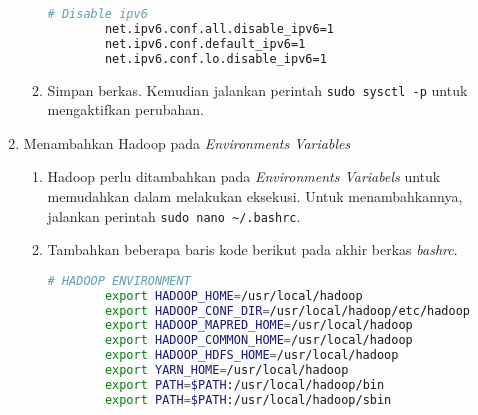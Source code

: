 \begin{enumerate}
\begin{enumerate}
      \begin{lstlisting}[language=bash]
    	# Disable ipv6
		net.ipv6.conf.all.disable_ipv6=1
		net.ipv6.conf.default_ipv6=1
		net.ipv6.conf.lo.disable_ipv6=1
      \end{lstlisting}
    \item Simpan berkas. Kemudian jalankan perintah \verb|sudo sysctl -p| untuk mengaktifkan perubahan.
  \end{enumerate}
  \item Menambahkan Hadoop pada \textit{Environments Variables}
  \begin{enumerate}
    \item Hadoop perlu ditambahkan pada \textit{Environments Variabels} untuk memudahkan dalam melakukan eksekusi. Untuk menambahkannya, jalankan perintah \verb|sudo nano ~/.bashrc|.
    \item Tambahkan beberapa baris kode berikut pada akhir berkas \textit{bashrc}.
      \begin{lstlisting}[language=bash]
		# HADOOP ENVIRONMENT
		export HADOOP_HOME=/usr/local/hadoop
		export HADOOP_CONF_DIR=/usr/local/hadoop/etc/hadoop
		export HADOOP_MAPRED_HOME=/usr/local/hadoop
		export HADOOP_COMMON_HOME=/usr/local/hadoop
		export HADOOP_HDFS_HOME=/usr/local/hadoop
		export YARN_HOME=/usr/local/hadoop
		export PATH=$PATH:/usr/local/hadoop/bin
		export PATH=$PATH:/usr/local/hadoop/sbin
		

\end{lstlisting}
\end{enumerate}
\end{enumerate}
